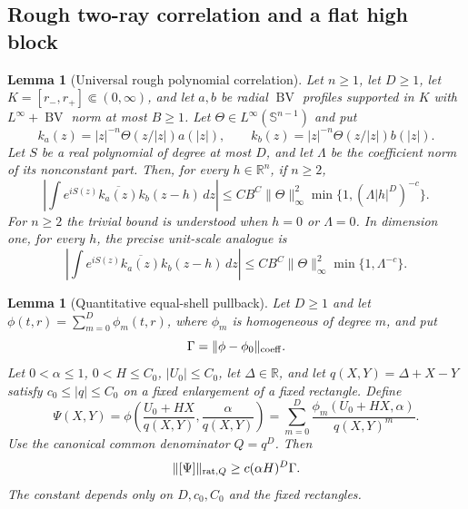 \documentclass[11pt]{article}
\numberwithin{equation}{section}
\newtheorem{lemma}[theorem]{Lemma}
\theoremstyle{remark}
\theoremstyle{definition}
\newcommand{\R}{\mathbb R}
\newcommand{\Sph}{\mathbb S}
\newcommand{\norm}[1]{\lVert #1\rVert}
\newcommand{\BV}{\operatorname{BV}}
\begin{document}
\subsection{Rough two-ray correlation and a flat high block}

\begin{lemma}[Universal rough polynomial correlation]
\label{lem:rough-correlation}
Let $n\ge1$, let $D\ge1$, let $K=[r_-,r_+]\Subset(0,\infty)$, and let
$a,b$ be radial $\BV$ profiles supported in $K$ with
$L^\infty+\BV$ norm at most $B\ge1$.  Let
$\Theta\in L^\infty(\Sph^{n-1})$ and put
\[
 k_a(z)=|z|^{-n}\Theta(z/|z|)a(|z|),\qquad
 k_b(z)=|z|^{-n}\Theta(z/|z|)b(|z|).
\]
Let
$S$ be a real polynomial of degree at most $D$, and let $\Lambda$ be the
coefficient norm of its nonconstant part.  Then, for every $h\in\R^n$,
if $n\ge2$,
\begin{equation}\label{eq:rough-correlation}
 \left|\int e^{iS(z)}\overline{k_a(z)}k_b(z-h)\,dz\right|
 \le CB^C\norm\Theta_\infty^2
 \min\{1,(\Lambda|h|^D)^{-c}\}.
\end{equation}
For $n\ge2$ the trivial bound is understood when $h=0$ or $\Lambda=0$.
In dimension one, for every $h$, the precise unit-scale analogue is
\[
 \left|\int e^{iS(z)}\overline{k_a(z)}k_b(z-h)\,dz\right|
 \le CB^C\norm\Theta_\infty^2\min\{1,\Lambda^{-c}\}.
\]
\end{lemma}

\begin{lemma}[Quantitative equal-shell pullback]
\label{lem:equal-pullback}
Let $D\ge1$ and let
$\phi(t,r)=\sum_{m=0}^D\phi_m(t,r)$, where $\phi_m$ is homogeneous of
degree $m$, and put
\[
 \Gamma=\norm{\phi-\phi_0}_{\rm coeff}.
\]
Let $0<\alpha\le1$, $0<H\le C_0$, $|U_0|\le C_0$, let
$\Delta\in\R$, and let $q(X,Y)=\Delta+X-Y$ satisfy
$c_0\le|q|\le C_0$ on a fixed enlargement of
a fixed rectangle.  Define
\begin{equation}\label{eq:equal-pullback-phase}
 \Psi(X,Y)
 =\phi\left(\frac{U_0+HX}{q(X,Y)},
             \frac{\alpha}{q(X,Y)}\right)
 =\sum_{m=0}^D\frac{\phi_m(U_0+HX,\alpha)}{q(X,Y)^m}.
\end{equation}
Use the canonical common denominator $Q=q^D$.  Then
\begin{equation}\label{eq:equal-pullback-lower}
 \norm{[\Psi]}_{{\rm rat},Q}
 \ge c(\alpha H)^D\Gamma.
\end{equation}
The constant depends only on $D,c_0,C_0$ and the fixed rectangles.
\end{lemma}
\end{document}
